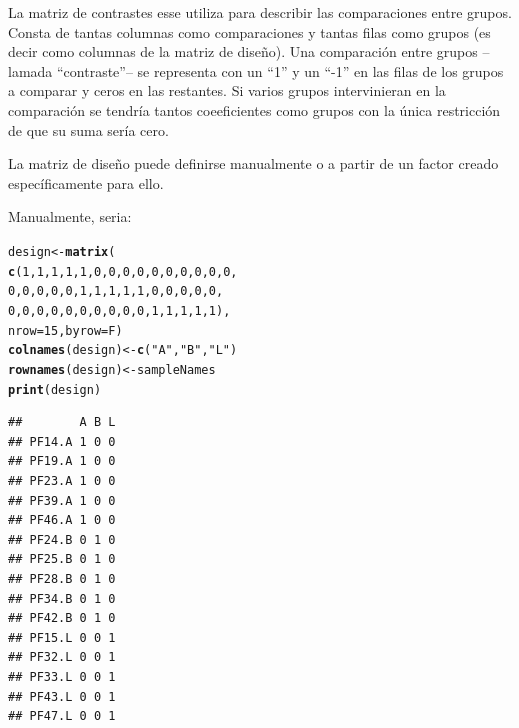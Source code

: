 \documentclass[a4paper]{article}\usepackage[]{graphicx}\usepackage[]{color}
\makeatletter
\newcommand{\hlnum}[1]{\textcolor[rgb]{0.686,0.059,0.569}{#1}}%
\newcommand{\hlstr}[1]{\textcolor[rgb]{0.192,0.494,0.8}{#1}}%
\newcommand{\hlstd}[1]{\textcolor[rgb]{0.345,0.345,0.345}{#1}}%
\newcommand{\hlkwb}[1]{\textcolor[rgb]{0.69,0.353,0.396}{#1}}%
\newcommand{\hlkwc}[1]{\textcolor[rgb]{0.333,0.667,0.333}{#1}}%
\newcommand{\hlkwd}[1]{\textcolor[rgb]{0.737,0.353,0.396}{\textbf{#1}}}%
\newenvironment{kframe}{%
 \def\at@end@of@kframe{}%
 \ifinner\ifhmode%
  \def\at@end@of@kframe{\end{minipage}}%
  \begin{minipage}{\columnwidth}%
 \fi\fi%
 \def\FrameCommand##1{\hskip\@totalleftmargin \hskip-\fboxsep
 \colorbox{shadecolor}{##1}\hskip-\fboxsep
     \hskip-\linewidth \hskip-\@totalleftmargin \hskip\columnwidth}%
 \MakeFramed {\advance\hsize-\width
   \@totalleftmargin\z@ \linewidth\hsize
   \@setminipage}}%
 {\par\unskip\endMakeFramed%
 \at@end@of@kframe}
\newenvironment{knitrout}{}{} %
\makeatother
\begin{document}
La matriz de contrastes esse utiliza para describir las comparaciones entre grupos. Consta de tantas columnas como comparaciones y tantas filas como grupos (es decir como columnas de la matriz de diseño). Una comparaci\'on entre grupos --lamada ``contraste''-- se representa con un ``1'' y un ``-1'' en las filas de los grupos a comparar y ceros en las restantes. Si varios grupos intervinieran en la comparaci\'on se tendría tantos coeeficientes como grupos con la única restricción de que su suma sería cero. 

La matriz de diseño puede definirse manualmente o a partir de un factor 
creado específicamente para ello.

Manualmente, seria:
\begin{knitrout}
\color{fgcolor}\begin{kframe}
\begin{alltt}
\hlstd{design}\hlkwb{<-}\hlkwd{matrix}\hlstd{(}
            \hlkwd{c}\hlstd{(}\hlnum{1}\hlstd{,}\hlnum{1}\hlstd{,}\hlnum{1}\hlstd{,}\hlnum{1}\hlstd{,}\hlnum{1}\hlstd{,}\hlnum{0}\hlstd{,}\hlnum{0}\hlstd{,}\hlnum{0}\hlstd{,}\hlnum{0}\hlstd{,}\hlnum{0}\hlstd{,}\hlnum{0}\hlstd{,}\hlnum{0}\hlstd{,}\hlnum{0}\hlstd{,}\hlnum{0}\hlstd{,}\hlnum{0}\hlstd{,}
              \hlnum{0}\hlstd{,}\hlnum{0}\hlstd{,}\hlnum{0}\hlstd{,}\hlnum{0}\hlstd{,}\hlnum{0}\hlstd{,}\hlnum{1}\hlstd{,}\hlnum{1}\hlstd{,}\hlnum{1}\hlstd{,}\hlnum{1}\hlstd{,}\hlnum{1}\hlstd{,}\hlnum{0}\hlstd{,}\hlnum{0}\hlstd{,}\hlnum{0}\hlstd{,}\hlnum{0}\hlstd{,}\hlnum{0}\hlstd{,}
              \hlnum{0}\hlstd{,}\hlnum{0}\hlstd{,}\hlnum{0}\hlstd{,}\hlnum{0}\hlstd{,}\hlnum{0}\hlstd{,}\hlnum{0}\hlstd{,}\hlnum{0}\hlstd{,}\hlnum{0}\hlstd{,}\hlnum{0}\hlstd{,}\hlnum{0}\hlstd{,}\hlnum{1}\hlstd{,}\hlnum{1}\hlstd{,}\hlnum{1}\hlstd{,}\hlnum{1}\hlstd{,}\hlnum{1}\hlstd{),}
            \hlkwc{nrow}\hlstd{=}\hlnum{15}\hlstd{,}\hlkwc{byrow}\hlstd{=F)}
\hlkwd{colnames}\hlstd{(design)}\hlkwb{<-}\hlkwd{c}\hlstd{(}\hlstr{"A"}\hlstd{,} \hlstr{"B"}\hlstd{,} \hlstr{"L"}\hlstd{)}
\hlkwd{rownames}\hlstd{(design)} \hlkwb{<-}  \hlstd{sampleNames}
\hlkwd{print}\hlstd{(design)}
\end{alltt}
\begin{verbatim}
##        A B L
## PF14.A 1 0 0
## PF19.A 1 0 0
## PF23.A 1 0 0
## PF39.A 1 0 0
## PF46.A 1 0 0
## PF24.B 0 1 0
## PF25.B 0 1 0
## PF28.B 0 1 0
## PF34.B 0 1 0
## PF42.B 0 1 0
## PF15.L 0 0 1
## PF32.L 0 0 1
## PF33.L 0 0 1
## PF43.L 0 0 1
## PF47.L 0 0 1
\end{verbatim}
\end{kframe}
\end{knitrout}
\end{document}
